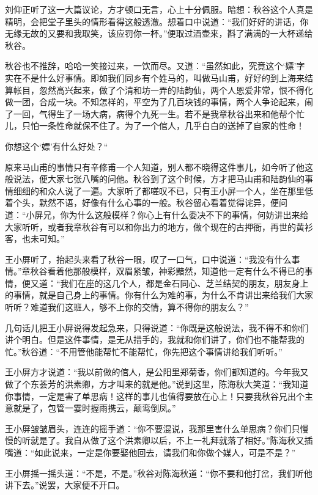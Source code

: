\documentclass[12pt,UTF8]{ctexbook}
\begin{document}
{{{刘仰正听了这一大篇议论，方才顿口无言，心上十分佩服。暗想：秋谷这个人真是精明，会把堂子里头的情形看得这般透澈。想着口中说道：“我们好好的讲话，你无缘无故的又要和我取笑，该应罚你一杯。”便取过酒壶来，斟了满满的一大杯递给秋谷。

秋谷也不推辞，哈哈一笑接过来，一饮而尽。又道：“虽然如此，究竟这个‘嫖’字实在不是什么好事情。即如我们同乡有个姓马的，叫做马山甫，好好的到上海来结算帐目，忽然高兴起来，做了个清和坊一弄的陆韵仙，两个人恩爱非常，恨不得化做一团，合成一块。不知怎样的，平空为了几百块钱的事情，两个人争论起来，闹了一回，气得生了一场大病，病得个九死一生。若不是我章秋谷出来和他帮个忙儿，只怕一条性命就保不住了。为了一个倌人，几乎白白的送掉了自家的性命！

你想这个‘嫖’有什么好处？“

原来马山甫的事情只有辛修甫一个人知道，别人都不晓得这件事儿，如今听了他这般说法，便大家七张八嘴的问他。秋谷到了这个时候，方才把马山甫和陆韵仙的事情细细的和众人说了一遍。大家听了都嗟叹不已，只有王小屏一个人，坐在那里低着个头，默然不语，好像有什么心事的一般。秋谷留心看着觉得诧异，便问道：“小屏兄，你为什么这般模样？你心上有什么委决不下的事情，何妨讲出来给大家听听，或者我章秋谷有可以和你出力的地方，做个现在的古押衙，再世的黄衫客，也未可知。”

王小屏听了，抬起头来看了秋谷一眼，叹了一口气，口中说道：“我没有什么事情。”章秋谷看着他那般模样，双眉紧皱，神彩黯然，知道他一定有什么不得已的事情，便又道：“我们在座的这几个人，都是金石同心、芝兰结契的朋友，朋友身上的事情，就是自己身上的事情。你有什么为难的事，为什么不肯讲出来给我们大家听听？难道我们这班人，够不上你的交情，算不得你的朋友么？”

几句话儿把王小屏说得发起急来，只得说道：“你既是这般说法，我不得不和你们讲个明白。但是这件事情，是无从措手的，我就和你们讲了，你们也不能帮我的忙。”秋谷道：“不用管他能帮忙不能帮忙，你先把这个事情讲给我们听听。”

王小屏方才说道：“我以前做的倌人，是公阳里郑菊香，你们都知道的。今年我又做了个东荟芳的洪素卿，方才叫来的就是他。”说到这里，陈海秋大笑道：“我知道你事情，一定是害了单思病！这样的事儿也值得要放在心上！只要我秋谷兄出个主意就是了，包管一霎时握雨携云，颠鸾倒凤。”

王小屏皱皱眉头，连连的摇手道：“你不要混说，我那里害什么单思病？你们只慢慢的听就是了。我自从做了这个洪素卿以后，不上一礼拜就落了相好。”陈海秋又插嘴道：“如此说来，一定是你要娶他回去，请我们和你做个媒人，可是不是？”

王小屏摇一摇头道：“不是，不是。”秋谷对陈海秋道：“你不要和他打岔，我们听他讲下去。”说罢，大家便不开口。

}}}
\end{document}
